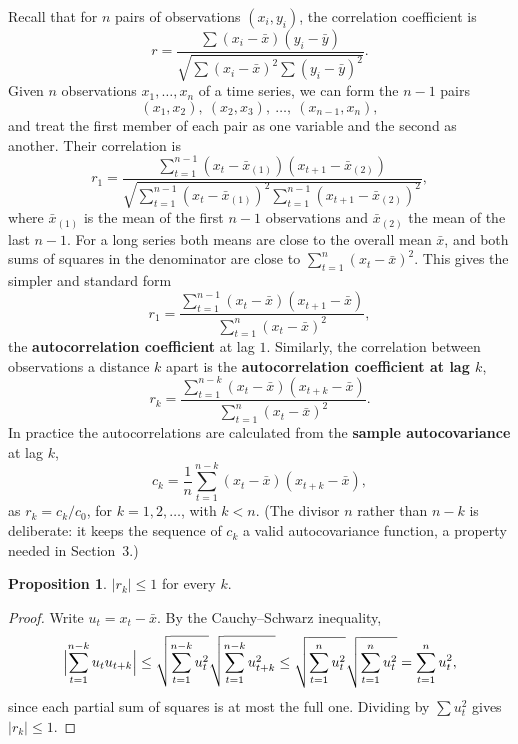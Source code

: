 \documentclass[11pt,a4paper]{article}
\theoremstyle{definition}
\newtheorem{prop}[thm]{Proposition}
\begin{document}
Recall that for $n$ pairs of observations $(x_i, y_i)$, the correlation coefficient is
\[
r = \frac{\sum(x_i - \bar x)(y_i - \bar y)}{\sqrt{\sum(x_i - \bar x)^2\sum(y_i - \bar y)^2}} .
\]
Given $n$ observations $x_1, \dots, x_n$ of a time series, we can form the $n - 1$ pairs
\[
(x_1, x_2), \ (x_2, x_3), \ \dots, \ (x_{n-1}, x_n) ,
\]
and
treat the first member of each pair as one variable and the second as another. Their correlation is
\[
r_1 = \frac{\sum_{t=1}^{n-1}(x_t - \bar x_{(1)})(x_{t+1} - \bar x_{(2)})}{\sqrt{\sum_{t=1}^{n-1}(x_t - \bar x_{(1)})^2\sum_{t=1}^{n-1}(x_{t+1} - \bar x_{(2)})^2}} ,
\]
where $\bar x_{(1)}$ is the mean of the first $n - 1$ observations and $\bar x_{(2)}$ the mean of the last $n - 1$. For a long series both means
are close to the overall mean $\bar x$, and both sums of squares in the denominator are close to $\sum_{t=1}^n(x_t - \bar x)^2$. This
gives the simpler and standard form
\[
r_1 = \frac{\sum_{t=1}^{n-1}(x_t - \bar x)(x_{t+1} - \bar x)}{\sum_{t=1}^{n}(x_t - \bar x)^2} ,
\]
the \textbf{autocorrelation coefficient} at lag $1$. Similarly, the correlation between observations a
distance $k$ apart is the \textbf{autocorrelation coefficient at lag $k$},
\[
r_k = \frac{\sum_{t=1}^{n-k}(x_t - \bar x)(x_{t+k} - \bar x)}{\sum_{t=1}^{n}(x_t - \bar x)^2} .
\]
In practice the autocorrelations are calculated from the \textbf{sample autocovariance} at lag $k$,
\[
c_k = \frac1n\sum_{t=1}^{n-k}(x_t - \bar x)(x_{t+k} - \bar x) ,
\]
as $r_k = c_k/c_0$, for $k = 1, 2, \dots$, with $k < n$. (The divisor $n$ rather than $n - k$ is deliberate: it keeps the sequence of
$c_k$ a valid autocovariance function, a property needed in Section~3.)

\begin{prop}\label{prop:rk-bound}
$|r_k| \le 1$ for every $k$.
\end{prop}

\begin{proof}
Write $u_t = x_t - \bar x$. By the Cauchy--Schwarz inequality,
\[
\Bigl|\sum_{t=1}^{n-k}u_tu_{t+k}\Bigr| \le \sqrt{\sum_{t=1}^{n-k}u_t^2}\sqrt{\sum_{t=1}^{n-k}u_{t+k}^2} \le \sqrt{\sum_{t=1}^nu_t^2}\sqrt{\sum_{t=1}^nu_t^2} = \sum_{t=1}^nu_t^2 ,
\]
since each partial sum of squares is at most the full one. Dividing by $\sum u_t^2$ gives $|r_k| \le 1$.
\end{proof}
\end{document}

